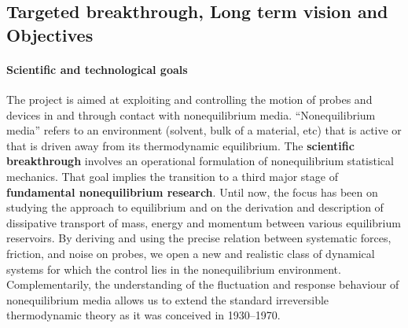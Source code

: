 \subsection{Targeted breakthrough, Long term vision and Objectives}\label{sec:objectives}


\paragraph{Scientific and technological goals}

The project is aimed at exploiting and controlling the motion of probes and devices in and
through contact with nonequilibrium media. ``Nonequilibrium media'' refers to an environment
(solvent, bulk of a material, etc) that is active or that is driven away from its
thermodynamic equilibrium.
%
The {\bf scientific
  breakthrough} involves an operational formulation of nonequilibrium statistical mechanics.
That goal implies the transition to a third major stage of {\bf fundamental nonequilibrium
  research}. Until now, the focus has been on studying the approach to equilibrium and on
the derivation and description of dissipative transport of mass, energy and momentum between
various equilibrium reservoirs.  By deriving and using the precise relation between
systematic forces, friction, and noise on probes, we open a new and realistic class of
dynamical systems for which the control lies in the nonequilibrium environment.
Complementarily, the understanding of the fluctuation and response behaviour of nonequilibrium
media allows us to extend the standard irreversible thermodynamic theory as it was conceived in
1930--1970.

